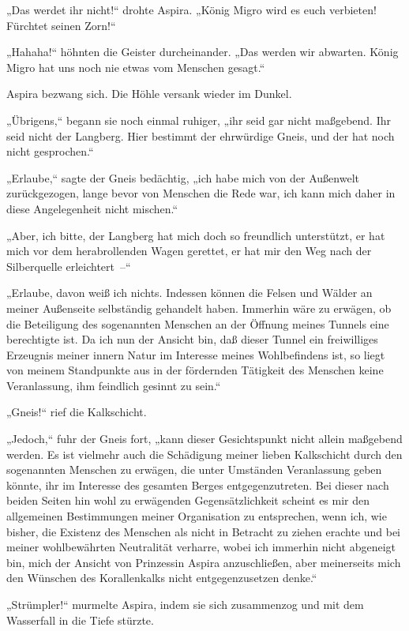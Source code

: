 „Das werdet ihr nicht!“ drohte Aspira. „König Migro wird es euch
verbieten! Fürchtet seinen Zorn!“

„Hahaha!“ höhnten die Geister durcheinander. „Das werden wir
abwarten. König Migro hat uns noch nie etwas vom Menschen gesagt.“

Aspira bezwang sich. Die Höhle versank wieder im Dunkel.

„Übrigens,“ begann sie noch einmal ruhiger, „ihr seid gar nicht
maßgebend. Ihr seid nicht der Langberg. Hier bestimmt der
ehrwürdige Gneis, und der hat noch nicht gesprochen.“

„Erlaube,“ sagte der Gneis bedächtig, „ich habe mich von der
Außenwelt zurückgezogen, lange bevor von Menschen die Rede war, ich
kann mich daher in diese Angelegenheit nicht mischen.“

„Aber, ich bitte, der Langberg hat mich doch so freundlich
unterstützt, er hat mich vor dem herabrollenden Wagen gerettet, er
hat mir den Weg nach der Silberquelle erleichtert~–“

„Erlaube, davon weiß ich nichts. Indessen können die Felsen und
Wälder an meiner Außenseite selbständig gehandelt haben. Immerhin
wäre zu erwägen, ob die Beteiligung des sogenannten Menschen an der
Öffnung meines Tunnels eine berechtigte ist. Da ich nun der Ansicht
bin, daß dieser Tunnel ein freiwilliges Erzeugnis meiner innern
Natur im Interesse meines Wohlbefindens ist, so liegt von meinem
Standpunkte aus in der fördernden Tätigkeit des Menschen keine
Veranlassung, ihm feindlich gesinnt zu sein.“

„Gneis!“ rief die Kalkschicht.

„Jedoch,“ fuhr der Gneis fort, „kann dieser Gesichtspunkt nicht
allein maßgebend werden. Es ist vielmehr auch die Schädigung meiner
lieben Kalkschicht durch den sogenannten Menschen zu erwägen, die
unter Umständen Veranlassung geben könnte, ihr im Interesse des
gesamten Berges entgegenzutreten. Bei dieser nach beiden Seiten hin
wohl zu erwägenden Gegensätzlichkeit scheint es mir den allgemeinen
Bestimmungen meiner Organisation zu entsprechen, wenn ich, wie
bisher, die Existenz des Menschen als nicht in Betracht zu ziehen
erachte und bei meiner wohlbewährten Neutralität verharre, wobei
ich immerhin nicht abgeneigt bin, mich der Ansicht von Prinzessin
Aspira anzuschließen, aber meinerseits mich den Wünschen des
Korallenkalks nicht entgegenzusetzen denke.“

„Strümpler!“ murmelte Aspira, indem sie sich zusammenzog und mit
dem Wasserfall in die Tiefe stürzte.

